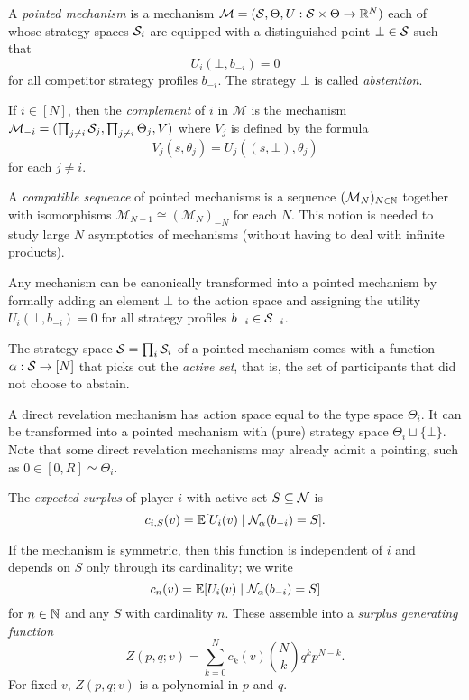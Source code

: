 \begin{definition}

  A \emph{pointed mechanism} is a mechanism $\mathcal{M}=(\mathcal{S},\Theta,U:\mathcal{S}\times\Theta\rightarrow\mathbb{R}^N)$ each of whose strategy spaces $\mathcal{S}_i$ are equipped with a distinguished point $\bot\in\mathcal{S}$ such that
  \[
    U_i(\bot,b_{-i})=0 
  \]
  for all competitor strategy profiles $b_{-i}$.
  The strategy $\bot$ is called \emph{abstention}.

  If $i\in[N]$, then the \emph{complement} of $i$ in $\mathcal{M}$ is the mechanism $\mathcal{M}_{-i}=(\prod_{j\neq i}\mathcal{S}_j,\prod_{j\neq i}\Theta_j,V)$ where $V_j$ is defined by the formula
  \[
    V_j(s,\theta_j) = U_j((s,\bot),\theta_j)
  \]
  for each $j\neq i$.
  
  A \emph{compatible sequence} of pointed mechanisms is a sequence $(\mathcal{M}_N)_{N\in\mathbb{N}}$ together with isomorphisms $\mathcal{M}_{N-1}\cong (\mathcal{M}_N)_{-N}$ for each $N$.
  This notion is needed to study large $N$ asymptotics of mechanisms (without having to deal with infinite products).

\end{definition}

Any mechanism can be canonically transformed into a pointed mechanism by formally adding an element $\bot$ to the action space and assigning the utility $U_i(\bot,b_{-i})=0$ for all strategy profiles $b_{-i}\in\mathcal{S}_{-i}$.

The strategy space $\mathcal{S}=\prod_i\mathcal{S}_i$ of a pointed mechanism comes with a function $\alpha:\mathcal{S}\rightarrow[N]$ that picks out the \emph{active set}, that is, the set of participants that did not choose to abstain.

\begin{example}

  A direct revelation mechanism has action space equal to the type space $\Theta_i$.
  It can be transformed into a pointed mechanism with (pure) strategy space $\Theta_i\sqcup\{\bot\}$.
  Note that some direct revelation mechanisms may already admit a pointing, such as $0\in [0,R]\simeq\Theta_i$.

\end{example}


\begin{definition}

  The \emph{expected surplus} of player $i$ with active set $S\subseteq \mathcal{N}$ is
  \[
    c_{i,S}(v) = \mathbb{E}[U_i(v) \mid \mathcal{N}_\alpha(b_{-i})=S].
  \]

  If the mechanism is symmetric, then this function is independent of $i$ and depends on $S$ only through its cardinality; we write
  \[
    c_{n}(v) = \mathbb{E}[U_i(v) \mid \mathcal{N}_\alpha(b_{-i})=S]
  \]
  for $n\in\mathbb{N}$ and any $S$ with cardinality $n$.
  These assemble into a \emph{surplus generating function}
  \[
    Z(p,q;v) = \sum_{k=0}^N c_{k}(v){N\choose k} q^kp^{N-k}.
  \]
  For fixed $v$, $Z(p,q;v)$ is a polynomial in $p$ and $q$.
  
\end{definition}

